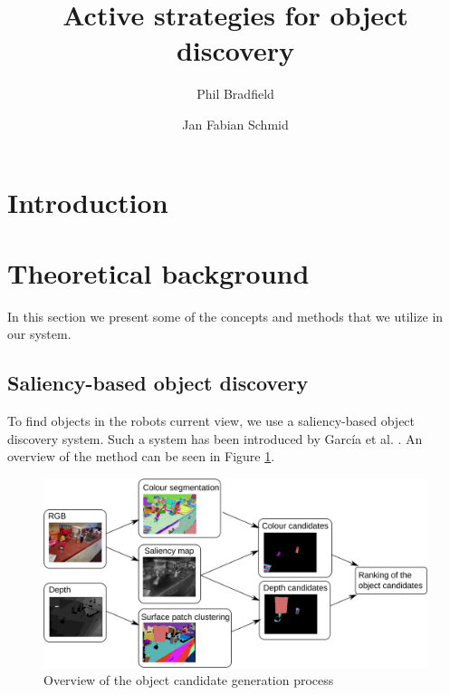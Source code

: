 \documentclass[a4paper,11pt,english]{article}
\begin{document}
\title{Active strategies for object discovery}
\author{Phil Bradfield \and Jan Fabian Schmid}

\maketitle 

\section{Introduction}
\label{Introduction}



\section{Theoretical background}
\label{Theoretical_background}

In this section we present some of the concepts and methods that we utilize in our system.

\subsection{Saliency-based object discovery}
\label{Theoretical_background:Saliency-based_object_discovery}
To find objects in the robots current view, we use a saliency-based object discovery system.
Such a system has been introduced by García et al. \cite{garcia2015saliency}.
An overview of the method can be seen in Figure \ref{fig:2Dobject_discovery}.

\begin{figure}[h!]
	\begin{center}
		\includegraphics[width=1\textwidth]{src/saliency_object_detection.png}
		\caption{ Overview of the object candidate generation process \cite{garcia2015saliency}}
		\label{fig:2Dobject_discovery}
	\end{center}
\end{figure}
\end{document}
